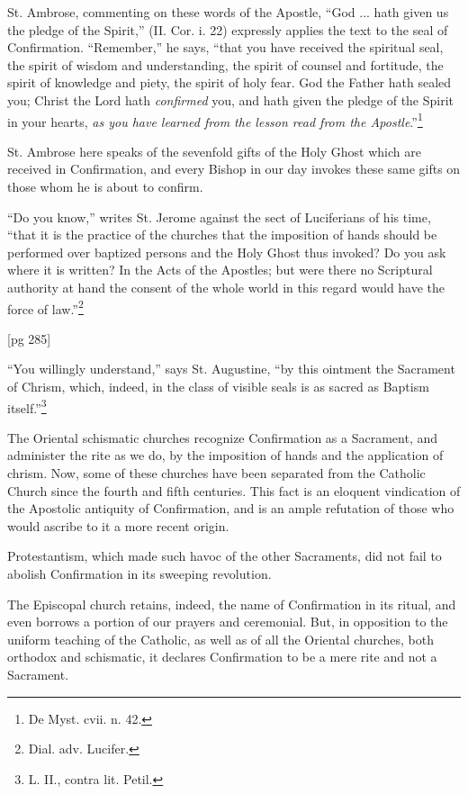 St. Ambrose, commenting on these words of the
Apostle, “God ... hath given us the pledge of
the Spirit,” (II. Cor. i. 22) expressly applies the
text to the seal of Confirmation. “Remember,”
he says, “that you have received the spiritual seal,
the spirit of wisdom and understanding, the spirit
of counsel and fortitude, the spirit of knowledge
and piety, the spirit of holy fear. God the Father
hath sealed you; Christ the Lord hath \emph{confirmed}
you, and hath given the pledge of the Spirit in
your hearts, \emph{as you have learned from the lesson
read from the Apostle}.”\footnote{De Myst. cvii. n. 42.}

St. Ambrose here speaks of the sevenfold gifts
of the Holy Ghost which are received in Confirmation,
and every Bishop in our day invokes these
same gifts on those whom he is about to confirm.

“Do you know,” writes St. Jerome against the
sect of Luciferians of his time, “that it is the practice
of the churches that the imposition of hands
should be performed over baptized persons and
the Holy Ghost thus invoked? Do you ask where
it is written? In the Acts of the Apostles; but
were there no Scriptural authority at hand the
consent of the whole world in this regard would
have the force of law.”\footnote{Dial. adv. Lucifer.}

[pg 285]

“You willingly understand,” says St. Augustine,
“by this ointment the Sacrament of Chrism,
which, indeed, in the class of visible seals is as
sacred as Baptism itself.”\footnote{L. II., contra lit. Petil.}

The Oriental schismatic churches recognize Confirmation
as a Sacrament, and administer the rite
as we do, by the imposition of hands and the application
of chrism. Now, some of these churches
have been separated from the Catholic Church
since the fourth and fifth centuries. This fact is
an eloquent vindication of the Apostolic antiquity
of Confirmation, and is an ample refutation of
those who would ascribe to it a more recent origin.

Protestantism, which made such havoc of the
other Sacraments, did not fail to abolish Confirmation
in its sweeping revolution.

The Episcopal church retains, indeed, the name
of Confirmation in its ritual, and even borrows a
portion of our prayers and ceremonial. But, in
opposition to the uniform teaching of the Catholic,
as well as of all the Oriental churches, both orthodox
and schismatic, it declares Confirmation to
be a mere rite and not a Sacrament.

